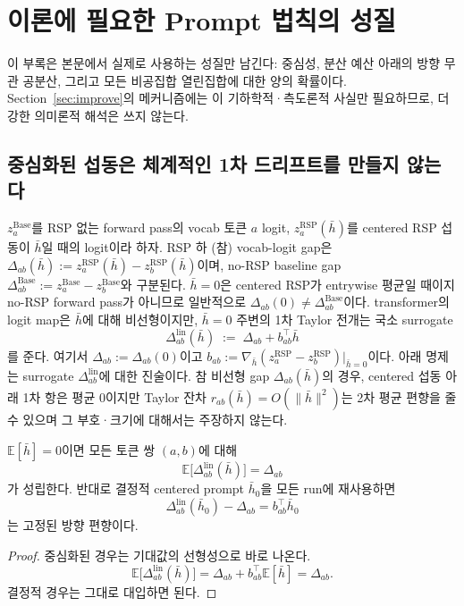 \clearpage
\section{이론에 필요한 Prompt 법칙의 성질}\label{app:why_random}

이 부록은 본문에서 실제로 사용하는 성질만 남긴다: 중심성, 분산 예산 아래의 방향 무관 공분산, 그리고 모든 비공집합 열린집합에 대한 양의 확률이다. Section~\ref{sec:improve}의 메커니즘에는 이 기하학적·측도론적 사실만 필요하므로, 더 강한 의미론적 해석은 쓰지 않는다.

\subsection{중심화된 섭동은 체계적인 1차 드리프트를 만들지 않는다}

$z^{\text{Base}}_a$를 RSP 없는 forward pass의 vocab 토큰 $a$ logit, $z^{\text{RSP}}_a(\bar h)$를 centered RSP 섭동이 $\bar h$일 때의 logit이라 하자. RSP 하 (참) vocab-logit gap은 $\Delta_{ab}(\bar h) := z^{\text{RSP}}_a(\bar h) - z^{\text{RSP}}_b(\bar h)$이며, no-RSP baseline gap $\Delta^{\text{Base}}_{ab} := z^{\text{Base}}_a - z^{\text{Base}}_b$와 구분된다. $\bar h = 0$은 centered RSP가 entrywise 평균일 때이지 no-RSP forward pass가 아니므로 일반적으로 $\Delta_{ab}(0) \ne \Delta^{\text{Base}}_{ab}$이다. transformer의 logit map은 $\bar h$에 대해 비선형이지만, $\bar h = 0$ 주변의 1차 Taylor 전개는 국소 surrogate
\[
\Delta_{ab}^{\mathrm{lin}}(\bar h) \;:=\; \Delta_{ab} + b_{ab}^\top \bar h
\]
를 준다. 여기서 $\Delta_{ab} := \Delta_{ab}(0)$이고 $b_{ab} := \nabla_{\bar h}(z^{\text{RSP}}_a - z^{\text{RSP}}_b)|_{\bar h = 0}$이다. 아래 명제는 surrogate $\Delta_{ab}^{\mathrm{lin}}$에 대한 진술이다. 참 비선형 gap $\Delta_{ab}(\bar h)$의 경우, centered 섭동 아래 1차 항은 평균 0이지만 Taylor 잔차 $r_{ab}(\bar h) = O(\|\bar h\|^2)$는 2차 평균 편향을 줄 수 있으며 그 부호·크기에 대해서는 주장하지 않는다.

\begin{proposition}\label{prop:centered_no_drift}
$\mathbb{E}[\bar h]=0$이면 모든 토큰 쌍 $(a,b)$에 대해
\[
\mathbb{E}\big[\Delta_{ab}^{\mathrm{lin}}(\bar h)\big] = \Delta_{ab}
\]
가 성립한다. 반대로 결정적 centered prompt $\bar h_0$을 모든 run에 재사용하면
\[
\Delta_{ab}^{\mathrm{lin}}(\bar h_0)-\Delta_{ab} = b_{ab}^\top \bar h_0
\]
는 고정된 방향 편향이다.
\end{proposition}

\begin{proof}
중심화된 경우는 기대값의 선형성으로 바로 나온다.
\[
\mathbb{E}\big[\Delta_{ab}^{\mathrm{lin}}(\bar h)\big]
=
\Delta_{ab} + b_{ab}^\top \mathbb{E}[\bar h]
=
\Delta_{ab}.
\]
결정적 경우는 그대로 대입하면 된다.
\end{proof}

